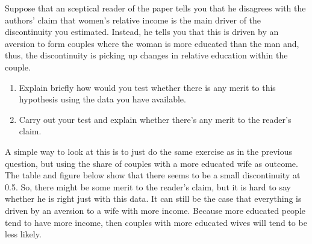 \documentclass[a4paper, 11pt,addpoints,answers]{exam}
\begin{document}
\begin{questions}
\begin{solution}
	
\end{solution}
\question[15] Suppose that an sceptical reader of the paper tells you that he disagrees with the authors' claim that women's relative income is the main driver of the discontinuity you estimated. Instead, he tells you that this is driven by an aversion to form couples where the woman is more educated than the man and, thus, the discontinuity is picking up changes in relative education within the couple.
\begin{enumerate}[label=(\alph*)]
\item Explain briefly how would you test whether there is any merit to this hypothesis using the data you have available. 
\item Carry out your test and explain whether there's any merit to the reader's claim.
\end{enumerate}
\begin{solution}
	A simple way to look at this is to just do the same exercise as in the previous question, but using the share of couples with a more educated wife as outcome. The table and figure below show that there seems to be a small discontinuity at 0.5. So, there might be some merit to the reader's claim, but it is hard to say whether he is right just with this data. It can still be the case that everything is driven by an aversion to a wife with more income. Because more educated people tend to have more income, then couples with more educated wives will tend to be less likely. 
	
	
\end{solution}
\end{questions}

{}
\end{document}
